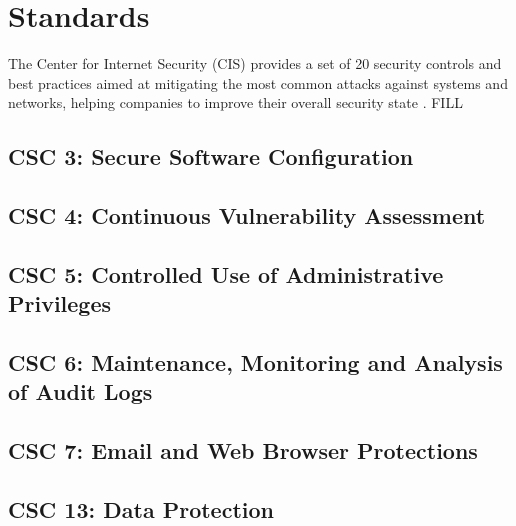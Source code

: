 \section{Standards} 
	The Center for Internet Security (CIS) provides a set of 20 security controls and best practices aimed at mitigating the most common attacks against systems and networks, helping companies to improve their overall security state \cite{cis}. FILL\\
	\subsection{CSC 3: Secure Software Configuration}
	\subsection{CSC 4: Continuous Vulnerability Assessment}
	\subsection{CSC 5: Controlled Use of Administrative Privileges}
	\subsection{CSC 6: Maintenance, Monitoring and Analysis of Audit Logs}
	\subsection{CSC 7: Email and Web Browser Protections}
	\subsection{CSC 13: Data Protection}


